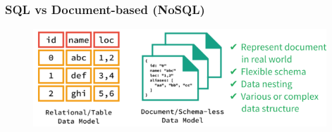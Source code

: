 \documentclass[10pt, compress]{beamer}
\begin{document}

\begin{frame}[fragile]
  \frametitle{SQL vs Document-based (NoSQL)}

  \begin{figure}[ht]
    \centering
    \vspace{-25pt}
    \includegraphics[width=11cm]{include/literature-nosql.png}
    \vspace{-10pt}
    \label{fig:literature-nosql}
  \end{figure}

\end{frame}



\end{document}
